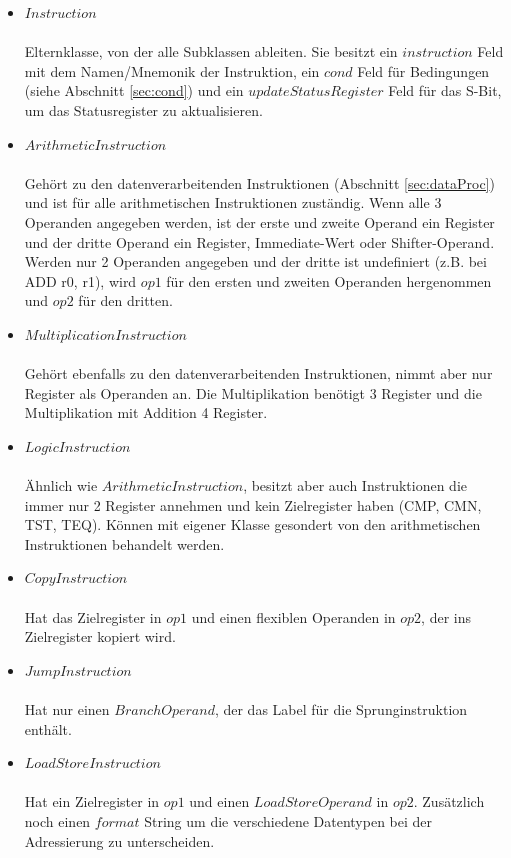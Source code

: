 \documentclass[a4paper, 11pt, onecolumn]{article}
\begin{document}
\begin{itemize}
\item $Instruction$\\ \\Elternklasse, von der alle Subklassen ableiten. Sie besitzt ein $instruction$ Feld mit dem Namen/Mnemonik der Instruktion, ein $cond$ Feld für Bedingungen (siehe Abschnitt \ref{sec:cond}) und ein $updateStatusRegister$ Feld für das S-Bit, um das Statusregister zu aktualisieren.
\item $ArithmeticInstruction$\\ \\Gehört zu den datenverarbeitenden Instruktionen (Abschnitt \ref{sec:dataProc}) und ist für alle arithmetischen Instruktionen zuständig. Wenn alle 3 Operanden angegeben werden, ist der erste und zweite Operand ein Register und der dritte Operand ein Register, Immediate-Wert oder Shifter-Operand. Werden nur 2 Operanden angegeben und der dritte ist undefiniert (z.B. bei ADD r0, r1), wird $op1$ für den ersten und zweiten Operanden hergenommen und $op2$ für den dritten.
\item $MultiplicationInstruction$\\ \\Gehört ebenfalls zu den datenverarbeitenden Instruktionen, nimmt aber nur Register als Operanden an. Die Multiplikation benötigt 3 Register und die Multiplikation mit Addition 4 Register.
\item $LogicInstruction$\\ \\Ähnlich wie $ArithmeticInstruction$, besitzt aber auch Instruktionen die immer nur 2 Register annehmen und kein Zielregister haben (CMP, CMN, TST, TEQ). Können mit eigener Klasse gesondert von den arithmetischen Instruktionen behandelt werden.
\item $CopyInstruction$\\ \\Hat das Zielregister in $op1$ und einen flexiblen Operanden in $op2$, der ins Zielregister kopiert wird.
\item $JumpInstruction$\\ \\Hat nur einen $BranchOperand$, der das Label für die Sprunginstruktion enthält.
\item $LoadStoreInstruction$\\ \\Hat ein Zielregister in $op1$ und einen $LoadStoreOperand$ in $op2$. Zusätzlich noch einen $format$ String um die verschiedene Datentypen bei der Adressierung zu unterscheiden.

\end{itemize}
\end{document}
